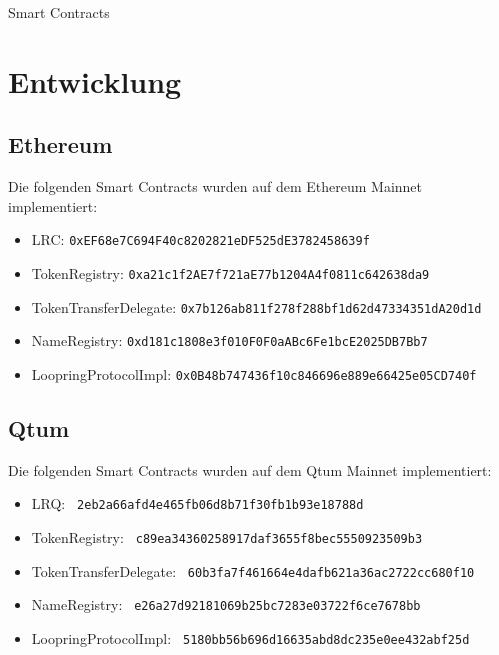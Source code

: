 \documentclass[UTF8,nofonts]{article}
\makeatletter
\newenvironment{figurehere}
 {\def\@captype{figure}}
 {}
\makeatother
\begin{document}
\begin{appendices}
\begin{center}
\begin{figurehere}
\caption{Smart Contracts}
\label{fig:smartcontracts}
\end{figurehere}
\end{center}

\section{Entwicklung}

\subsection{Ethereum}
Die folgenden Smart Contracts wurden auf dem Ethereum Mainnet implementiert:
\begin{itemize}
\item LRC: \verb|0xEF68e7C694F40c8202821eDF525dE3782458639f|
\item TokenRegistry: \verb|0xa21c1f2AE7f721aE77b1204A4f0811c642638da9|
\item TokenTransferDelegate: \verb|0x7b126ab811f278f288bf1d62d47334351dA20d1d|
\item NameRegistry: \verb|0xd181c1808e3f010F0F0aABc6Fe1bcE2025DB7Bb7|
\item LoopringProtocolImpl: \verb|0x0B48b747436f10c846696e889e66425e05CD740f|
\end{itemize}

\subsection{Qtum}
Die folgenden Smart Contracts wurden auf dem Qtum Mainnet implementiert:
\begin{itemize}
\item LRQ: \verb| 2eb2a66afd4e465fb06d8b71f30fb1b93e18788d |
\item TokenRegistry: \verb| c89ea34360258917daf3655f8bec5550923509b3 |
\item TokenTransferDelegate: \verb| 60b3fa7f461664e4dafb621a36ac2722cc680f10 |
\item NameRegistry: \verb| e26a27d92181069b25bc7283e03722f6ce7678bb |
\item LoopringProtocolImpl: \verb| 5180bb56b696d16635abd8dc235e0ee432abf25d |
\end{itemize}

\end{appendices}
\end{document}
